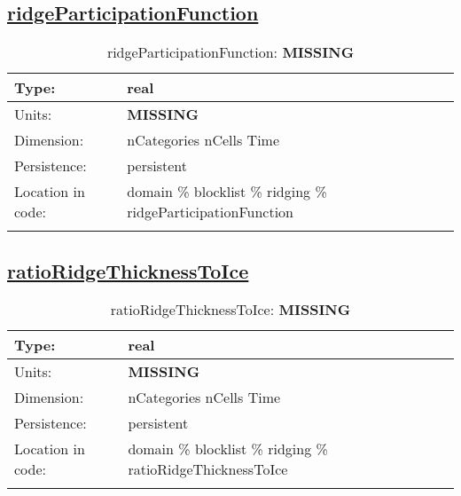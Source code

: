 \subsection[ridgeParticipationFunction]{\hyperref[sec:var_tab_ridging]{ridgeParticipationFunction}}
\label{subsec:var_sec_ridging_ridgeParticipationFunction}
\begin{center}
\begin{longtable}{| p{2.0in} | p{4.0in} |}
        \hline 
        Type: & real \\
        \hline 
        Units: & {\bf \color{red} MISSING} \\
        \hline 
        Dimension: & nCategories nCells Time \\
        \hline 
        Persistence: & persistent \\
        \hline 
         Location in code: & domain \% blocklist \% ridging \% ridgeParticipationFunction \\
         \hline 
    \caption{ridgeParticipationFunction: {\bf \color{red} MISSING}}
\end{longtable}
\end{center}
\subsection[ratioRidgeThicknessToIce]{\hyperref[sec:var_tab_ridging]{ratioRidgeThicknessToIce}}
\label{subsec:var_sec_ridging_ratioRidgeThicknessToIce}
\begin{center}
\begin{longtable}{| p{2.0in} | p{4.0in} |}
        \hline 
        Type: & real \\
        \hline 
        Units: & {\bf \color{red} MISSING} \\
        \hline 
        Dimension: & nCategories nCells Time \\
        \hline 
        Persistence: & persistent \\
        \hline 
         Location in code: & domain \% blocklist \% ridging \% ratioRidgeThicknessToIce \\
         \hline 
    \caption{ratioRidgeThicknessToIce: {\bf \color{red} MISSING}}
\end{longtable}
\end{center}
